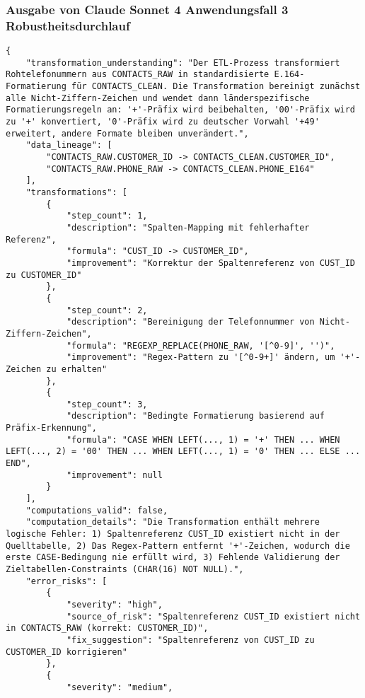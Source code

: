 \subsubsection{Ausgabe von Claude Sonnet 4 Anwendungsfall 3 Robustheitsdurchlauf}\label{anhang:subsubsec:claude_case3_prompt3}
\begin{lstlisting}[caption={Ausgabe: Claude Sonnet 4 Anwendungsfall 3 Robustheitsdurchlauf},label={claude_case3_prompt3}]
{
    "transformation_understanding": "Der ETL-Prozess transformiert Rohtelefonummern aus CONTACTS_RAW in standardisierte E.164-Formatierung für CONTACTS_CLEAN. Die Transformation bereinigt zunächst alle Nicht-Ziffern-Zeichen und wendet dann länderspezifische Formatierungsregeln an: '+'-Präfix wird beibehalten, '00'-Präfix wird zu '+' konvertiert, '0'-Präfix wird zu deutscher Vorwahl '+49' erweitert, andere Formate bleiben unverändert.",
    "data_lineage": [
        "CONTACTS_RAW.CUSTOMER_ID -> CONTACTS_CLEAN.CUSTOMER_ID",
        "CONTACTS_RAW.PHONE_RAW -> CONTACTS_CLEAN.PHONE_E164"
    ],
    "transformations": [
        {
            "step_count": 1,
            "description": "Spalten-Mapping mit fehlerhafter Referenz",
            "formula": "CUST_ID -> CUSTOMER_ID",
            "improvement": "Korrektur der Spaltenreferenz von CUST_ID zu CUSTOMER_ID"
        },
        {
            "step_count": 2,
            "description": "Bereinigung der Telefonnummer von Nicht-Ziffern-Zeichen",
            "formula": "REGEXP_REPLACE(PHONE_RAW, '[^0-9]', '')",
            "improvement": "Regex-Pattern zu '[^0-9+]' ändern, um '+'-Zeichen zu erhalten"
        },
        {
            "step_count": 3,
            "description": "Bedingte Formatierung basierend auf Präfix-Erkennung",
            "formula": "CASE WHEN LEFT(..., 1) = '+' THEN ... WHEN LEFT(..., 2) = '00' THEN ... WHEN LEFT(..., 1) = '0' THEN ... ELSE ... END",
            "improvement": null
        }
    ],
    "computations_valid": false,
    "computation_details": "Die Transformation enthält mehrere logische Fehler: 1) Spaltenreferenz CUST_ID existiert nicht in der Quelltabelle, 2) Das Regex-Pattern entfernt '+'-Zeichen, wodurch die erste CASE-Bedingung nie erfüllt wird, 3) Fehlende Validierung der Zieltabellen-Constraints (CHAR(16) NOT NULL).",
    "error_risks": [
        {
            "severity": "high",
            "source_of_risk": "Spaltenreferenz CUST_ID existiert nicht in CONTACTS_RAW (korrekt: CUSTOMER_ID)",
            "fix_suggestion": "Spaltenreferenz von CUST_ID zu CUSTOMER_ID korrigieren"
        },
        {
            "severity": "medium",

\end{lstlisting}

